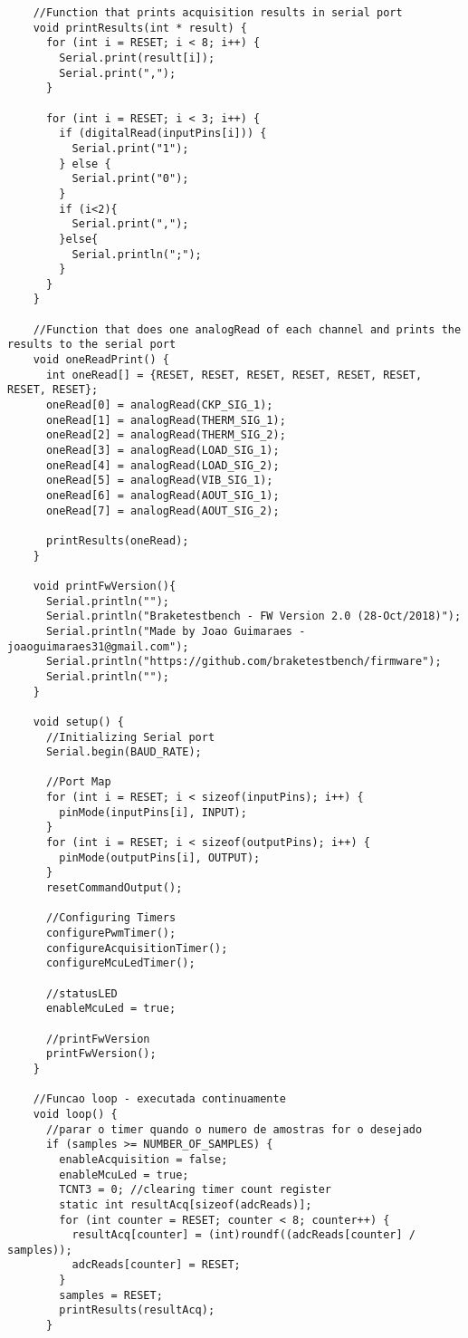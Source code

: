 \begin{lstlisting}
    //Function that prints acquisition results in serial port
    void printResults(int * result) {  
      for (int i = RESET; i < 8; i++) {
        Serial.print(result[i]);
        Serial.print(",");
      }

      for (int i = RESET; i < 3; i++) {
        if (digitalRead(inputPins[i])) {
          Serial.print("1");
        } else {
          Serial.print("0");
        }
        if (i<2){
          Serial.print(",");
        }else{
          Serial.println(";");
        }
      }
    }

    //Function that does one analogRead of each channel and prints the results to the serial port
    void oneReadPrint() {
      int oneRead[] = {RESET, RESET, RESET, RESET, RESET, RESET, RESET, RESET};
      oneRead[0] = analogRead(CKP_SIG_1);
      oneRead[1] = analogRead(THERM_SIG_1);
      oneRead[2] = analogRead(THERM_SIG_2);
      oneRead[3] = analogRead(LOAD_SIG_1);
      oneRead[4] = analogRead(LOAD_SIG_2);
      oneRead[5] = analogRead(VIB_SIG_1);
      oneRead[6] = analogRead(AOUT_SIG_1);
      oneRead[7] = analogRead(AOUT_SIG_2);

      printResults(oneRead);
    }

    void printFwVersion(){
      Serial.println("");
      Serial.println("Braketestbench - FW Version 2.0 (28-Oct/2018)");
      Serial.println("Made by Joao Guimaraes - joaoguimaraes31@gmail.com");
      Serial.println("https://github.com/braketestbench/firmware");
      Serial.println("");
    }

    void setup() {
      //Initializing Serial port
      Serial.begin(BAUD_RATE);
      
      //Port Map
      for (int i = RESET; i < sizeof(inputPins); i++) {
        pinMode(inputPins[i], INPUT);
      }
      for (int i = RESET; i < sizeof(outputPins); i++) {
        pinMode(outputPins[i], OUTPUT);
      }
      resetCommandOutput();

      //Configuring Timers
      configurePwmTimer();
      configureAcquisitionTimer();
      configureMcuLedTimer();

      //statusLED
      enableMcuLed = true;

      //printFwVersion
      printFwVersion();
    }

    //Funcao loop - executada continuamente
    void loop() {
      //parar o timer quando o numero de amostras for o desejado
      if (samples >= NUMBER_OF_SAMPLES) {
        enableAcquisition = false;
        enableMcuLed = true;
        TCNT3 = 0; //clearing timer count register
        static int resultAcq[sizeof(adcReads)];
        for (int counter = RESET; counter < 8; counter++) {
          resultAcq[counter] = (int)roundf((adcReads[counter] / samples));
          adcReads[counter] = RESET;
        }
        samples = RESET;
        printResults(resultAcq);
      }


\end{lstlisting}

